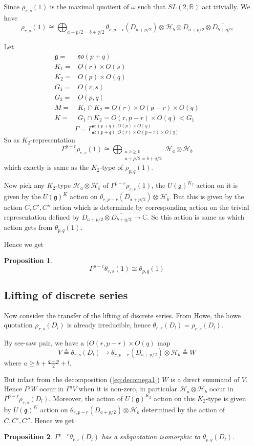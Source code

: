 \documentclass[12pt]{article}
\newtheorem{prop}{Proposition}
\def\bR{{\mathbb{R}}}
\def\bC{{\mathbb{C}}}
\def\aso{\mathfrak{so}}
\def\fgg{\mathfrak{g}}
\def\chh{\mathcal{H}}
\begin{document}
Since $\rho_{r,s}(1)$ is the maximal quotient of $\omega$ such that $SL(2,\bR)$ act trivially. 
We have 
\[
\rho_{r,s}(1) \cong \bigoplus_{a+p/2=b+q/2} \theta_{r,p-r}(D_{a+p/2})\otimes \chh_b \otimes D_{a+p/2}
\otimes \overline{D_{b+q/2}} 
\]

Let
\[
\begin{split}
\fgg=& \aso(p+q)\\
K_1 =& O(r)\times O(s)\\
K_2 =& O(p)\times O(q)\\
G_1 = &O(r,s)\\
G_2 = &O(p,q)\\
M = & K_1\cap K_2 = O(r)\times O(p-r)\times O(q)\\
K = & G_1\cap K_2 = O(r,p-r)\times O(q) < G_1
\end{split}
\]
\[
\Gamma = \Gamma_{\aso(p+q), O(r)\times O(p-r)\times O(q)}^{\aso(p+q), O(p)\times O(q)}
\]
So as $K_2$-representation  
\[
\Gamma^{p-r}\rho_{r,s}(1) \cong \bigoplus_{\substack{a,b \geq 0\\a+p/2=b+q/2}}
\chh_a\otimes \chh_b
\]
which exactly is same as the $K_2$-type of $\rho_{p,q}(1)$.

Now pick any $K_2$-type $\chh_a\otimes \chh_b$ of $\Gamma^{p-r}\rho_{r,s}(1)$, the $U(\fgg)^{K_2}$
action on it is given by the $U(\fgg)^{K}$ 
action on $\theta_{r,p-r}(D_{a+p/2})\otimes \chh_b$. But this is given by
the action $C,C',C''$ action which is determinde by corresponding 
action on the trivial representation defined by 
$D_{a+p/2}\otimes \overline{D_{b+q/2}}\to \bC$.
So this action is same as which action gets from $\theta_{p,q}(1)$.  

Hence we get 
\begin{prop}
\[
\Gamma^{p-r}\theta_{r,s}(1)\cong \theta_{p,q}(1)
\]
\end{prop}

\subsection{Lifting of discrete series}
Now consider the transfer of the lifting of discrete series. 
From Howe\cite{Howe1979Opq}, the howe quotation 
$\rho_{r,s}(D_l)$ is already irreducible, 
hence $\theta_{r,s}(D_l) = \rho_{r,s}(D_l)$.

By see-saw pair, we have a $(O(r,p-r)\times O(q)$ map
\[
V \triangleq \theta_{r,s}(D_l) \to \theta_{r,p-r}(D_{a+p/2})\otimes \chh_b\triangleq W
\]
where
$ a\geq b+\frac{q-p}{2}+l$.

But infact from the decomposition (\ref{eq:decomega1}) $W$
 is a direct summand of $V$.
Hence 
$\Gamma^jW$ occur in $\Gamma^jV$ when it is non-zero, in particular 
$\chh_a\otimes\chh_b$ occur in $\Gamma^{p-r}\rho_{r,s}(D_l)$. 
Moreover, the action of $U(\fgg)^{K_2}$ action on this $K_2$-type is given by
$U(\fgg)^K$ action on $\theta_{r,p-r}(D_{a+p/2}) \otimes\chh_b$ determined by 
the action of $C,C',C''$. Hence we get
\begin{prop}
$\Gamma^{p-r}\theta_{r,s}(D_l)$
has a subquotation isomorphic to $\theta_{p,q}(D_l)$.
\end{prop}
\end{document}
